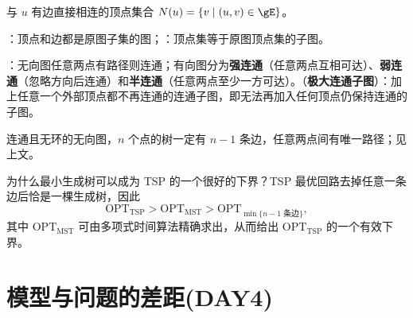 \documentclass[12pt]{article}
\begin{document}
\begin{defn}[邻居（neighbor）]
  与 $u$ 有边直接相连的顶点集合 $N(u)=\{v\mid (u,v)\in\gE\}$。
\end{defn}

\begin{defn}[子图与生成子图]
  ：顶点和边都是原图子集的图；：顶点集等于原图顶点集的子图。
\end{defn}

\begin{defn}[连通性与连通分量]
  ：无向图任意两点有路径则连通；有向图分为\textbf{强连通}（任意两点互相可达）、\textbf{弱连通}（忽略方向后连通）和\textbf{半连通}（任意两点至少一方可达）。（\textbf{极大连通子图}）：加上任意一个外部顶点都不再连通的连通子图，即无法再加入任何顶点仍保持连通的子图。
\end{defn}

\begin{defn}[树]
  连通且无环的无向图，$n$ 个点的树一定有 $n-1$ 条边，任意两点间有唯一路径；见上文。
\end{defn}

为什么最小生成树可以成为 TSP 的一个很好的下界？TSP 最优回路去掉任意一条边后恰是一棵生成树，因此
\[
  \mathrm{OPT}_{\mathrm{TSP}} > \mathrm{OPT}_{\mathrm{MST}} > \mathrm{OPT}_{\min\{n-1\text{ 条边}\}},
\]
其中 $\mathrm{OPT}_{\mathrm{MST}}$ 可由多项式时间算法精确求出，从而给出 $\mathrm{OPT}_{\mathrm{TSP}}$ 的一个有效下界。
\section{模型与问题的差距(DAY4)}
\end{document}
